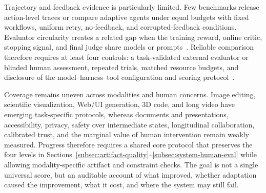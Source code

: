 Trajectory and feedback evidence is particularly limited. Few benchmarks release action-level traces or compare adaptive agents under equal budgets with fixed workflows, uniform retry, no-feedback, and corrupted-feedback conditions. Evaluator circularity creates a related gap when the training reward, online critic, stopping signal, and final judge share models or prompts~\cite{avg260211103,avg260601057,avg251123002}. Reliable comparison therefore requires at least four controls: a task-validated external evaluator or blinded human assessment, repeated trials, matched resource budgets, and disclosure of the model--harness--tool configuration and scoring protocol~\cite{avg260329139,avg250407046,avg260608091}.

Coverage remains uneven across modalities and human concerns. Image editing, scientific visualization, Web/UI generation, 3D code, and long video have emerging task-specific protocols, whereas documents and presentations, accessibility, privacy, safety over intermediate states, longitudinal collaboration, calibrated trust, and the marginal value of human intervention remain weakly measured. Progress therefore requires a shared core protocol that preserves the four levels in Sections~\ref{subsec:artifact-quality}--\ref{subsec:system-human-eval} while allowing modality-specific artifact and constraint checks. The goal is not a single universal score, but an auditable account of what improved, whether adaptation caused the improvement, what it cost, and where the system may still fail.
